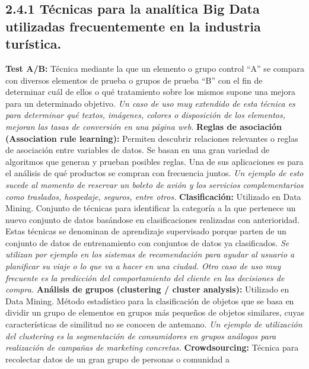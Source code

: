 \documentclass[
  letterpaper,
  DIV=11,
  numbers=noendperiod]{scrreprt}
\begin{document}
\hypertarget{tuxe9cnicas-para-la-analuxedtica-big-data-utilizadas-frecuentemente-en-la-industria-turuxedstica.}{%
\subsection{2.4.1 Técnicas para la analítica Big Data utilizadas
frecuentemente en la industria
turística.}\label{tuxe9cnicas-para-la-analuxedtica-big-data-utilizadas-frecuentemente-en-la-industria-turuxedstica.}}

\textbf{Test A/B:} Técnica mediante la que un elemento o grupo control
``A'' se compara con diversos elementos de prueba o grupos de prueba
``B'' con el fin de determinar cuál de ellos o qué tratamiento sobre los
mismos supone una mejora para un determinado objetivo. \emph{Un caso de
uso muy extendido de esta técnica es para determinar qué textos,
imágenes, colores o disposición de los elementos, mejoran las tasas de
conversión en una página web.} \textbf{Reglas de asociación (Association
rule learning):} Permiten descubrir relaciones relevantes o reglas de
asociación entre variables de datos. Se basan en una gran variedad de
algoritmos que generan y prueban posibles reglas. Una de sus
aplicaciones es para el análisis de qué productos se compran con
frecuencia juntos. \emph{Un ejemplo de esto sucede al momento de
reservar un boleto de avión y los servicios complementarios como
traslados, hospedaje, seguros, entre otros.} \textbf{Clasificación:}
Utilizado en Data Mining. Conjunto de técnicas para identificar la
categoría a la que pertenece un nuevo conjunto de datos basándose en
clasificaciones realizadas con anterioridad. Estas técnicas se denominan
de aprendizaje supervisado porque parten de un conjunto de datos de
entrenamiento con conjuntos de datos ya clasificados. \emph{Se utilizan
por ejemplo en los sistemas de recomendación para ayudar al usuario a
planificar su viaje o lo que va a hacer en una ciudad. Otro caso de uso
muy frecuente es la predicción del comportamiento del cliente en las
decisiones de compra.} \textbf{Análisis de grupos (clustering / cluster
analysis):} Utilizado en Data Mining. Método estadístico para la
clasificación de objetos que se basa en dividir un grupo de elementos en
grupos más pequeños de objetos similares, cuyas características de
similitud no se conocen de antemano. \emph{Un ejemplo de utilización del
clustering es la segmentación de consumidores en grupos análogos para
realización de campañas de marketing concretas.} \textbf{Crowdsourcing:}
Técnica para recolectar datos de un gran grupo de personas o comunidad a
\end{document}
